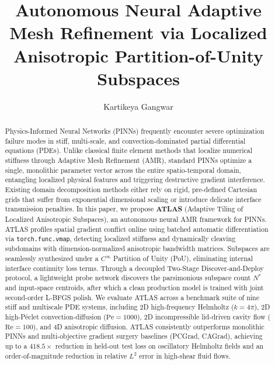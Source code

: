 \documentclass[runningheads]{llncs}
\begin{document}
\title{Autonomous Neural Adaptive Mesh Refinement via Localized Anisotropic Partition-of-Unity Subspaces}

\author{Kartikeya Gangwar}


\maketitle

\begin{abstract}
Physics-Informed Neural Networks (PINNs) frequently encounter severe optimization failure modes in stiff, multi-scale, and convection-dominated partial differential equations (PDEs). Unlike classical finite element methods that localize numerical stiffness through Adaptive Mesh Refinement (AMR), standard PINNs optimize a single, monolithic parameter vector across the entire spatio-temporal domain, entangling localized physical features and triggering destructive gradient interference. Existing domain decomposition methods either rely on rigid, pre-defined Cartesian grids that suffer from exponential dimensional scaling or introduce delicate interface transmission penalties. In this paper, we propose \textbf{ATLAS} (Adaptive Tiling of Localized Anisotropic Subspaces), an autonomous neural AMR framework for PINNs. ATLAS profiles spatial gradient conflict online using batched automatic differentiation via \texttt{torch.\allowbreak func.\allowbreak vmap}, detecting localized stiffness and dynamically cleaving subdomains with dimension-normalized anisotropic bandwidth matrices. Subspaces are seamlessly synthesized under a $C^\infty$ Partition of Unity (PoU), eliminating internal interface continuity loss terms. Through a decoupled Two-Stage Discover-and-Deploy protocol, a lightweight probe network discovers the parsimonious subspace count $N^*$ and input-space centroids, after which a clean production model is trained with joint second-order L-BFGS polish. We evaluate ATLAS across a benchmark suite of nine stiff and multiscale PDE systems, including 2D high-frequency Helmholtz ($k=4\pi$), 2D high-P\'eclet convection-diffusion ($\mathrm{Pe}=1000$), 2D incompressible lid-driven cavity flow ($\mathrm{Re}=100$), and 4D anisotropic diffusion. ATLAS consistently outperforms monolithic PINNs and multi-objective gradient surgery baselines (PCGrad, CAGrad), achieving up to a $418.5\times$ reduction in held-out test loss on oscillatory Helmholtz fields and an order-of-magnitude reduction in relative $L^2$ error in high-shear fluid flows.

\end{abstract}
\end{document}
